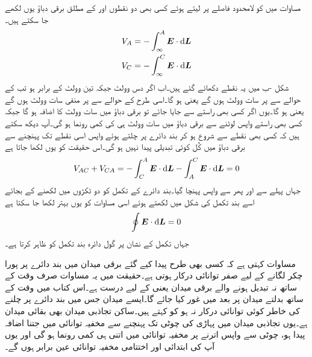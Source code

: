 مساوات  میں  کو لامحدود فاصلے پر لیتے ہوئے کسی بھی دو نقطوں  اور  کے مطلق برقی دباؤ یوں لکھے جا سکتے ہیں۔
\begin{align*}
V_A&=-\int_{\infty}^{A} \kvec{E} \cdot \dif \kvec{L}\\
V_C&=-\int_{\infty}^{C} \kvec{E} \cdot \dif \kvec{L}
\end{align*}
شکل -ب میں یہ نقطے دکھائے گئے ہیں۔اب اگر  دس وولٹ جبکہ  تین وولٹ کے برابر ہو تب  کے حوالے سے  پر سات وولٹ ہوں گے یعنی   ہو گا۔اسی طرح  کے حوالے سے  پر منفی سات وولٹ ہوں گے یعنی  ہو گا۔یوں اگر کسی بھی راستے   سے  جایا جائے تو برقی دباؤ میں سات وولٹ کا اضافہ ہو گا جبکہ کسی بھی راستے واپس  لوٹنے سے برقی دباؤ میں سات وولٹ ہی کی کمی رونما ہو گی۔آپ دیکھ سکتے ہیں کہ کسی بھی نقطے سے شروع ہو کر بند دائرے پر چلتے ہوئے واپس اسی نقطے تک پہنچنے سے برقی دباؤ میں کُل کوئی تبدیلی پیدا نہیں ہو گی۔اس حقیقت کو یوں لکھا جاتا ہے
\begin{align*}
V_{AC}+V_{CA}=-\int_{C}^{A} \kvec{E} \cdot \dif \kvec{L}-\int_{A}^{C} \kvec{E} \cdot \dif \kvec{L}=0
\end{align*}
جہاں پہلے  سے  اور پھر  سے واپس  پہنچا گیا۔بند دائرے کے تکمل کو دو ٹکڑوں میں لکھنے کے بجائے اسے بند تکمل کی شکل میں لکھتے ہوئے اسی مساوات کو یوں بہتر لکھا جا سکتا ہے 
\begin{align}\label{مساوات_توانائی_بند_راستہ}
\oint \kvec{E} \cdot \dif \kvec{L}=0
\end{align}
جہاں تکمل کے نشان پر گول دائرہ بند تکمل کو ظاہر کرتا ہے۔

مساوات  کہتی ہے کہ کسی بھی طرح پیدا کیے گئے برقی میدان میں بند دائرے پر پورا چکر لگانے کے لیے صفر توانائی درکار ہوتی ہے۔حقیقت میں یہ مساوات صرف وقت کے ساتھ نہ تبدیل ہونے والے برقی میدان یعنی   کے لیے درست ہے۔اس کتاب میں وقت کے ساتھ بدلتے میدان پر بعد میں غور کیا جائے گا۔ایسے میدان جس میں بند دائرے پر چلنے کی خاطر کوئی توانائی درکار نہ ہو کو  کہتے ہیں۔ساکن تجاذبی میدان بھی بقائی میدان ہے۔یوں تجاذبی میدان میں پہاڑی کی چوٹی تک پہنچنے سے مخفیہ توانائی میں جتنا اضافہ پیدا ہو، چوٹی سے واپس اترنے پر مخفیہ توانائی میں اتنی ہی کمی رونما ہو گی اور یوں آپ کی ابتدائی اور اختتامی مخفیہ توانائی عین برابر ہوں گے۔

